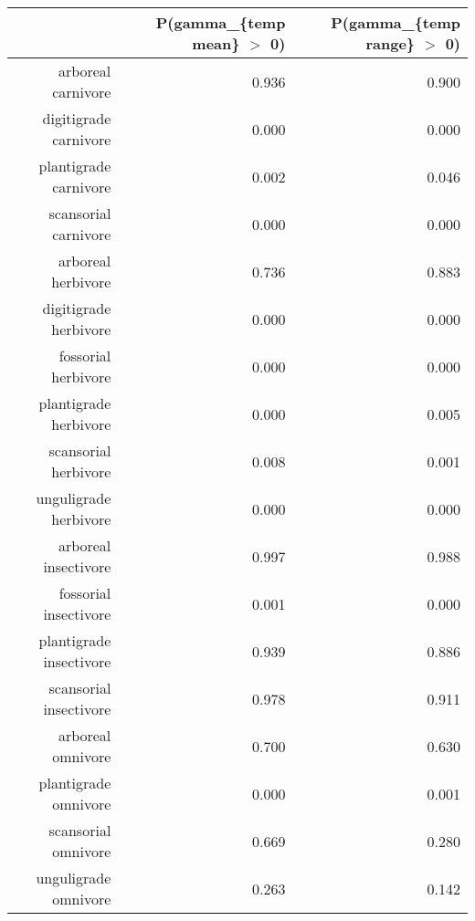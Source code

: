 \begin{table}[ht]
\centering
\begin{tabular}{rrr}
  \hline
 & P(gamma\_\{temp mean\} $>$ 0) & P(gamma\_\{temp range\} $>$ 0) \\ 
  \hline
arboreal carnivore & 0.936 & 0.900 \\ 
  digitigrade carnivore & 0.000 & 0.000 \\ 
  plantigrade carnivore & 0.002 & 0.046 \\ 
  scansorial carnivore & 0.000 & 0.000 \\ 
  arboreal herbivore & 0.736 & 0.883 \\ 
  digitigrade herbivore & 0.000 & 0.000 \\ 
  fossorial herbivore & 0.000 & 0.000 \\ 
  plantigrade herbivore & 0.000 & 0.005 \\ 
  scansorial herbivore & 0.008 & 0.001 \\ 
  unguligrade herbivore & 0.000 & 0.000 \\ 
  arboreal insectivore & 0.997 & 0.988 \\ 
  fossorial insectivore & 0.001 & 0.000 \\ 
  plantigrade insectivore & 0.939 & 0.886 \\ 
  scansorial insectivore & 0.978 & 0.911 \\ 
  arboreal omnivore & 0.700 & 0.630 \\ 
  plantigrade omnivore & 0.000 & 0.001 \\ 
  scansorial omnivore & 0.669 & 0.280 \\ 
  unguligrade omnivore & 0.263 & 0.142 \\ 
   \hline
\end{tabular}
\label{tab:occur_temp}
\end{table}
